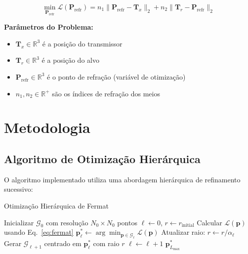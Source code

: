 \documentclass[12pt,a4paper]{article}
\begin{document}
\begin{destacadoazul}
\begin{equation}
\boxed{\min_{\mathbf{P}_{\text{refr}}} \mathcal{L}(\mathbf{P}_{\text{refr}}) = n_1 \|\mathbf{P}_{\text{refr}} - \mathbf{T}_x\|_2 + n_2 \|\mathbf{T}_r - \mathbf{P}_{\text{refr}}\|_2}
\label{eq:fermat}
\end{equation}
\end{destacadoazul}

\begin{tcolorbox}[colback=lightgray!20,colframe=darkgray,arc=5pt]
\textbf{Parâmetros do Problema:}
\begin{itemize}
    \item $\mathbf{T}_x \in \mathbb{R}^3$ é a posição do transmissor
    \item $\mathbf{T}_r \in \mathbb{R}^3$ é a posição do alvo
    \item $\mathbf{P}_{\text{refr}} \in \mathbb{R}^3$ é o ponto de refração (variável de otimização)
    \item $n_1, n_2 \in \mathbb{R}^+$ são os índices de refração dos meios
\end{itemize}
\end{tcolorbox}

\section{Metodologia}

\subsection{Algoritmo de Otimização Hierárquica}

O algoritmo implementado utiliza uma abordagem hierárquica de refinamento sucessivo:

\begin{algorithm}[H]
\caption{Otimização Hierárquica de Fermat}
\begin{algorithmic}[1]
\STATE Inicializar $\mathcal{G}_0$ com resolução $N_0 \times N_0$ pontos
\STATE $\ell \leftarrow 0$, $r \leftarrow r_{\text{initial}}$
        \STATE Calcular $\mathcal{L}(\mathbf{p})$ usando Eq.~\ref{eq:fermat}
    \ENDFOR
    \STATE $\mathbf{p}^*_\ell \leftarrow \arg\min_{\mathbf{p} \in \mathcal{G}_\ell} \mathcal{L}(\mathbf{p})$
    \STATE Atualizar raio: $r \leftarrow r/\alpha_\ell$
    \STATE Gerar $\mathcal{G}_{\ell+1}$ centrado em $\mathbf{p}^*_\ell$ com raio $r$
    \STATE $\ell \leftarrow \ell + 1$
\ENDWHILE
\RETURN $\mathbf{p}^*_{L_{\max}}$
\end{algorithmic}
\end{algorithm}
\end{document}

